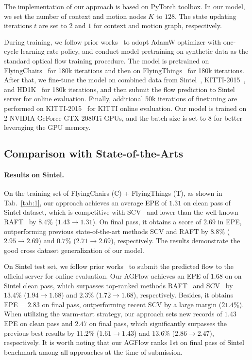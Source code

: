 \documentclass[letterpaper]{article} %
\begin{document}
The implementation of our approach is based on PyTorch toolbox. In our model, we set the number of context and motion nodes $K$ to $128$. The state updating iterations $t$ are set to $2$ and $1$ for context and motion graph, respectively.

During training, we follow prior works~\cite{Teed2020RAFTRA, Jiang2021LearningTE} to adopt AdamW optimizer with one-cycle learning rate policy, and conduct model pretraining on synthetic data as the standard optical flow training procedure. The model is pretrained on FlyingChairs~\cite{Dosovitskiy2015FlowNetLO} for 180k iterations and then on FlyingThings~\cite{Mayer2016ALD} for 180k iterations. After that, we fine-tune the model on combined data from Sintel~\cite{Butler2012}, KITTI-2015~\cite{KITTI_2015}, and HD1K~\cite{Kondermann2016TheHB} for 180k iterations, and then submit the flow prediction to Sintel server for online evaluation. Finally, additional 50k iterations of finetuning are performed on KITTI-2015~\cite{KITTI_2015} for KITTI online evaluation. Our model is trained on 2 NVIDIA GeForce GTX 2080Ti GPUs, and the batch size is set to $8$ for better leveraging the GPU memory.

\subsection{Comparison with State-of-the-Arts}

\paragraph{Results on Sintel.}

On the training set of FlyingChairs (C) + FlyingThings (T), as shown in Tab.~\ref{tab:1}, our approach achieves an average EPE of $1.31$ on clean pass of Sintel dataset, which is competitive with SCV~\cite{Jiang2021LearningOF} and lower than the well-known RAFT~\cite{Teed2020RAFTRA} by $8.4\%$ ($1.43 \rightarrow 1.31$). On final pass, it obtains a score of $2.69$ in EPE, outperforming previous state-of-the-art methods SCV and RAFT by $8.8\%$ ($2.95 \rightarrow 2.69$) and $0.7\%$ ($2.71 \rightarrow 2.69$), respectively. The results demonstrate the good cross dataset generalization of our model.

On Sintel test set, we follow prior works~\cite{Hui2018LiteFlowNetAL, Hur2019IterativeRR, Teed2020RAFTRA} to submit the predicted flow to the official server for online evaluation. Our AGFlow achieves an EPE of $1.68$ on on Sintel clean pass, which surpasses top-ranked methods RAFT~\cite{Teed2020RAFTRA} and SCV~\cite{Jiang2021LearningOF} by $13.4\%$ ($1.94 \rightarrow 1.68$) and $2.3\%$ ($1.72 \rightarrow 1.68$), respectively. Besides, it obtains EPE = $2.83$ on final pass, outperforming recent SCV by a large margin ($21.4\%$). When utilizing the warm-start strategy, our approach sets new records of $1.43$ EPE on clean pass and $2.47$ on final pass, which significantly surpasses the previous best results by $11.2\%$ ($1.61 \rightarrow 1.43$) and $13.6\%$ ($2.86 \rightarrow 2.47$), respectively. It is worth noting that our AGFlow ranks 1st on final pass of Sintel benchmark among all approaches at the time of submission.
\end{document}
